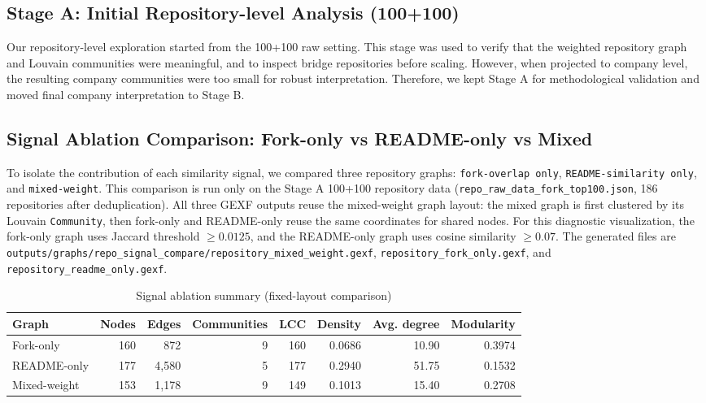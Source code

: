 \documentclass[11pt]{article}
\begin{document}
\subsection{Stage A: Initial Repository-level Analysis (100+100)}
Our repository-level exploration started from the 100+100 raw setting.
This stage was used to verify that the weighted repository graph and Louvain communities were meaningful, and to inspect bridge repositories before scaling.
However, when projected to company level, the resulting company communities were too small for robust interpretation.
Therefore, we kept Stage A for methodological validation and moved final company interpretation to Stage B.

\subsection{Signal Ablation Comparison: Fork-only vs README-only vs Mixed}
To isolate the contribution of each similarity signal, we compared three repository graphs:
\texttt{fork-overlap only}, \texttt{README-similarity only}, and \texttt{mixed-weight}.
This comparison is run only on the Stage A 100+100 repository data (\texttt{repo\_raw\_data\_fork\_top100.json}, 186 repositories after deduplication).
All three GEXF outputs reuse the mixed-weight graph layout: the mixed graph is first clustered by its Louvain \texttt{Community}, then fork-only and README-only reuse the same coordinates for shared nodes.
For this diagnostic visualization, the fork-only graph uses Jaccard threshold $\geq 0.0125$, and the README-only graph uses cosine similarity $\geq 0.07$.
The generated files are \texttt{outputs/graphs/repo\_signal\_compare/repository\_mixed\_weight.gexf},
\texttt{repository\_fork\_only.gexf}, and \texttt{repository\_readme\_only.gexf}.

\begin{table}[h]
\centering
\caption{Signal ablation summary (fixed-layout comparison)}
\begin{tabular}{lrrrrrrr}
\toprule
Graph & Nodes & Edges & Communities & LCC & Density & Avg. degree & Modularity \\
\midrule
Fork-only & 160 & 872 & 9 & 160 & 0.0686 & 10.90 & 0.3974 \\
README-only & 177 & 4,580 & 5 & 177 & 0.2940 & 51.75 & 0.1532 \\
Mixed-weight & 153 & 1,178 & 9 & 149 & 0.1013 & 15.40 & 0.2708 \\
\bottomrule
\end{tabular}
\label{tab:repo-signal-ablation}
\end{table}
\end{document}
